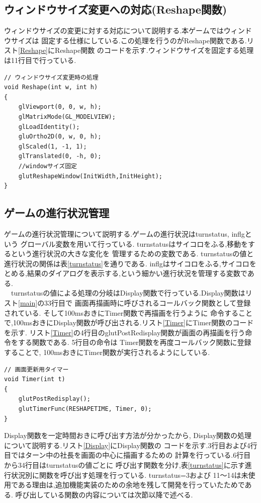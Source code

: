 \documentclass[a4j]{jarticle}
\begin{document}
    \subsection{ウィンドウサイズ変更への対応(Reshape関数)}
    ウィンドウサイズの変更に対する対応について説明する.本ゲームではウィンドウサイズは
    固定する仕様にしている.この処理を行うのがReshape関数である.リスト\ref{Reshape}にReshape関数
    のコードを示す.ウィンドウサイズを固定する処理は11行目で行っている.
    \begin{lstlisting}[basicstyle=\ttfamily\footnotesize, frame=single,label=Reshape,caption=Reshape関数]
// ウィンドウサイズ変更時の処理
void Reshape(int w, int h)
{
    glViewport(0, 0, w, h);
    glMatrixMode(GL_MODELVIEW);
    glLoadIdentity();
    gluOrtho2D(0, w, 0, h);
    glScaled(1, -1, 1);
    glTranslated(0, -h, 0);
    //windowサイズ固定 
    glutReshapeWindow(InitWidth,InitHeight);
}
    \end{lstlisting} 
    
    \subsection{ゲームの進行状況管理}
    ゲームの進行状況管理について説明する.ゲームの進行状況はturnstatus, inflgという
    グローバル変数を用いて行っている. turnstatusはサイコロをふる,移動をするという進行状況の大きな変化を
    管理するための変数である. turnstatusの値と進行状況の関係は表\ref{turnstatus}を通りである.
    inflgはサイコロをふる,サイコロをとめる,結果のダイアログを表示する,という細かい進行状況を管理する変数である.\\ 
    　turnstatusの値による処理の分岐はDisplay関数で行っている.Display関数はリスト\ref{main}の33行目で
    画面再描画時に呼びされるコールバック関数として登録されている. そして100msおきにTimer関数で再描画を行うように
    命令することで,100msおきにDisplay関数が呼び出される.リスト\ref{Timer}にTimer関数のコードを示す.
    リスト\ref{Timer}の4行目のglutPostRedisplay関数が画面の再描画を行う命令をする関数である. 5行目の命令は
    Timer関数を再度コールバック関数に登録することで, 100msおきにTimer関数が実行されるようにしている.
    \begin{lstlisting}[basicstyle=\ttfamily\footnotesize, frame=single,label=Timer,caption=Tiemr関数]
// 画面更新用タイマー
void Timer(int t)
{
    glutPostRedisplay();
    glutTimerFunc(RESHAPETIME, Timer, 0);
}
    \end{lstlisting} 

    Display関数を一定時間おきに呼び出す方法が分かったから, Display関数の処理について説明する.リスト\ref{Display}にDisplay関数の
    コードを示す.3行目および4行目ではターン中の社長を画面の中心に描画するための
    計算を行っている.6行目から34行目はturnstatusの値ごとに
    呼び出す関数を分け,表\ref{turnstatus}に示す進行状況別に関数を呼び出す処理を行っている. turnstatus=3および
    11～14は未使用である理由は,追加機能実装のための余地を残して開発を行っていたためである.
    呼び出している関数の内容については次節以降で述べる.
\end{document}
